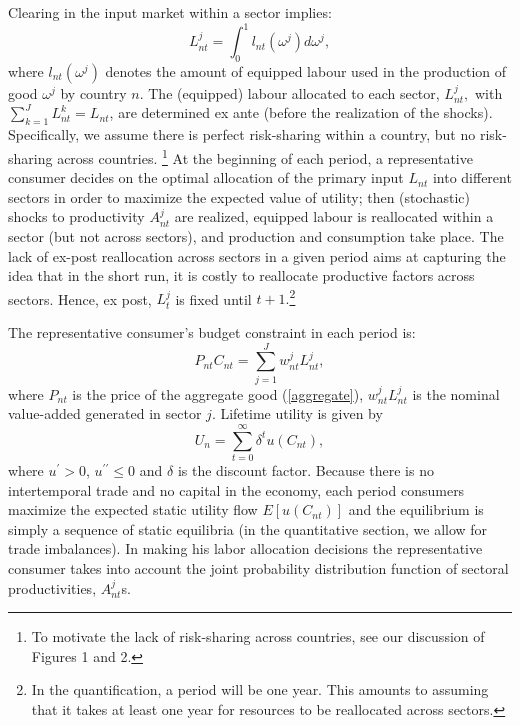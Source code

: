 \documentclass[12pt]{article}
\begin{document}
Clearing in the input market within a sector implies: 
\begin{equation*}
L_{nt}^{j}=\int_{0}^{1}l_{nt}(\omega ^{j})d\omega ^{j},
\end{equation*}%
where $l_{nt}(\omega ^{j})$ denotes the amount of equipped labour used in
the production of good $\omega ^{j}$ by country $n$. The (equipped) labour
allocated to each sector, $L_{nt}^{j},$ with $\sum%
\nolimits_{k=1}^{J}L_{nt}^{k}=L_{nt}$, are determined ex ante (before the
realization of the shocks). Specifically, we assume there is perfect
risk-sharing within a country, but no risk-sharing across countries.%
\footnote{%
To motivate the lack of risk-sharing across countries, see our discussion of
Figures 1 and 2.} At the beginning of each period, a representative consumer
decides on the optimal allocation of the primary input $L_{nt}$ into
different sectors in order to maximize the expected value of utility; then
(stochastic) shocks to productivity $A_{nt}^{j}$ are realized, equipped
labour is reallocated within a sector (but not across sectors), and
production and consumption take place. The lack of ex-post reallocation
across sectors in a given period aims at capturing the idea that in the
short run, it is costly to reallocate productive factors across sectors.
Hence, ex post, $L_{t}^{j}$ is fixed until $t+1.$\footnote{%
In the quantification, a period will be one year. This amounts to assuming
that it takes at least one year for resources to be reallocated across
sectors.}

The representative consumer's budget constraint in each period is: 
\begin{equation*}
P_{nt}C_{nt}=\sum_{j=1}^{J}w_{nt}^{j}L_{nt}^{j},
\end{equation*}
where $P_{nt}$ is the price of the aggregate good (\ref{aggregate}), $%
w_{nt}^{j}L_{nt}^{j}$ is the nominal value-added generated in sector $j$.
Lifetime utility is given by 
\begin{equation*}
U_{n}=\sum\limits_{t=0}^{\infty }\delta^{t}u(C_{nt}),
\end{equation*}
where $u^{\prime} > 0$, $u^{\prime\prime} \leq 0$ and $\delta$ is the
discount factor. Because there is no intertemporal trade and no capital in
the economy, each period consumers maximize the expected static utility flow 
$E\left[ u\left( C_{nt}\right) \right] $ and the equilibrium is simply a
sequence of static equilibria (in the quantitative section, we allow for
trade imbalances). In making his labor allocation decisions the
representative consumer takes into account the joint probability
distribution function of sectoral productivities, $A_{nt}^{j}$s.
\end{document}
